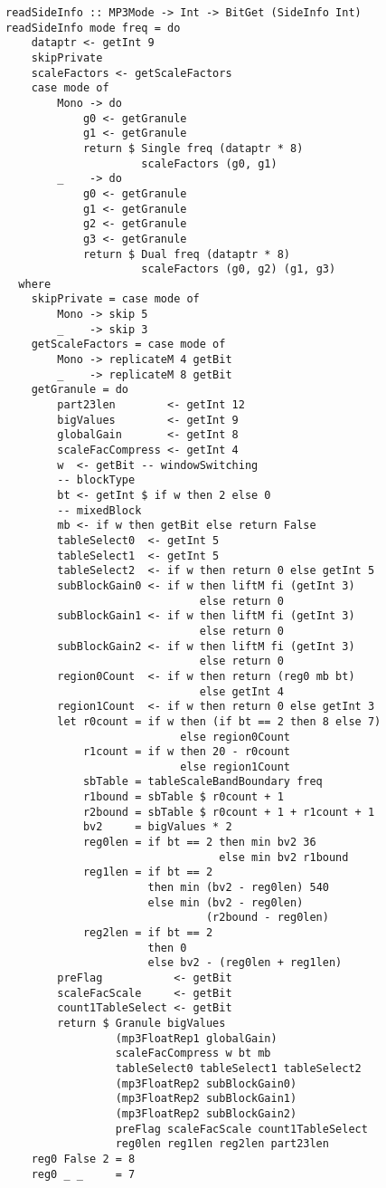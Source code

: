 \documentclass[a4paper,12pt]{article}
\begin{document}
    \begin{lstlisting}
readSideInfo :: MP3Mode -> Int -> BitGet (SideInfo Int)
readSideInfo mode freq = do
    dataptr <- getInt 9
    skipPrivate
    scaleFactors <- getScaleFactors
    case mode of
        Mono -> do
            g0 <- getGranule
            g1 <- getGranule
            return $ Single freq (dataptr * 8)
                     scaleFactors (g0, g1)
        _    -> do
            g0 <- getGranule
            g1 <- getGranule
            g2 <- getGranule
            g3 <- getGranule
            return $ Dual freq (dataptr * 8)
                     scaleFactors (g0, g2) (g1, g3)
  where
    skipPrivate = case mode of
        Mono -> skip 5
        _    -> skip 3
    getScaleFactors = case mode of
        Mono -> replicateM 4 getBit
        _    -> replicateM 8 getBit
    getGranule = do
        part23len        <- getInt 12
        bigValues        <- getInt 9
        globalGain       <- getInt 8
        scaleFacCompress <- getInt 4
        w  <- getBit -- windowSwitching
        -- blockType
        bt <- getInt $ if w then 2 else 0
        -- mixedBlock
        mb <- if w then getBit else return False
        tableSelect0  <- getInt 5
        tableSelect1  <- getInt 5
        tableSelect2  <- if w then return 0 else getInt 5
        subBlockGain0 <- if w then liftM fi (getInt 3)
                              else return 0
        subBlockGain1 <- if w then liftM fi (getInt 3)
                              else return 0
        subBlockGain2 <- if w then liftM fi (getInt 3)
                              else return 0
        region0Count  <- if w then return (reg0 mb bt)
                              else getInt 4
        region1Count  <- if w then return 0 else getInt 3
        let r0count = if w then (if bt == 2 then 8 else 7)
                           else region0Count
            r1count = if w then 20 - r0count
                           else region1Count
            sbTable = tableScaleBandBoundary freq
            r1bound = sbTable $ r0count + 1
            r2bound = sbTable $ r0count + 1 + r1count + 1
            bv2     = bigValues * 2
            reg0len = if bt == 2 then min bv2 36
                                 else min bv2 r1bound
            reg1len = if bt == 2
                      then min (bv2 - reg0len) 540
                      else min (bv2 - reg0len)
                               (r2bound - reg0len)
            reg2len = if bt == 2
                      then 0
                      else bv2 - (reg0len + reg1len)
        preFlag           <- getBit
        scaleFacScale     <- getBit
        count1TableSelect <- getBit
        return $ Granule bigValues
                 (mp3FloatRep1 globalGain)
                 scaleFacCompress w bt mb
                 tableSelect0 tableSelect1 tableSelect2
                 (mp3FloatRep2 subBlockGain0)
                 (mp3FloatRep2 subBlockGain1)
                 (mp3FloatRep2 subBlockGain2)
                 preFlag scaleFacScale count1TableSelect
                 reg0len reg1len reg2len part23len
    reg0 False 2 = 8
    reg0 _ _     = 7

    \end{lstlisting}
\end{document}
